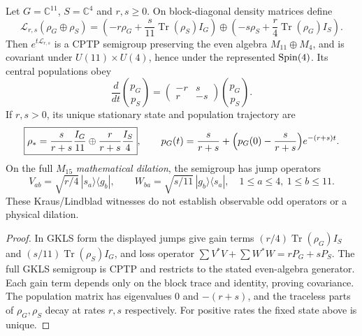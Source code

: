\documentclass[12pt,a4paper]{article}
\begin{document}
\begin{theorem}
\label{p4a:thm:v352-two-rate-transfer}
Let $G=\mathbb C^{11}$, $S=\mathbb C^4$ and $r,s\geq0$.
On block-diagonal density matrices define
\[
 \mathcal L_{r,s}(\rho_G\oplus\rho_S)=
 \left(-r\rho_G+\frac{s}{11}\operatorname{Tr}(\rho_S)I_G\right)
 \oplus
 \left(-s\rho_S+\frac{r}{4}\operatorname{Tr}(\rho_G)I_S\right).
\]
Then $e^{t\mathcal L_{r,s}}$ is a CPTP semigroup preserving the even
algebra $M_{11}\oplus M_4$, and is covariant under
$U(11)\times U(4)$, hence under the represented $\mathrm{Spin}(4)$.
Its central populations obey
\[
 \frac{d}{dt}\binom{p_G}{p_S}
 =\begin{pmatrix}-r&s\\r&-s\end{pmatrix}
   \binom{p_G}{p_S}.
\]
If $r,s>0$, its unique stationary state and population trajectory
are
\[
 \boxed{\rho_*=
 \frac{s}{r+s}\frac{I_G}{11}
 \oplus\frac{r}{r+s}\frac{I_S}{4}},\qquad
 p_G(t)=\frac{s}{r+s}
  +\Bigl(p_G(0)-\frac{s}{r+s}\Bigr)e^{-(r+s)t}.
\]
On the full $M_{15}$ \emph{mathematical dilation}, the semigroup has
jump operators
\[
 V_{ab}=\sqrt{r/4}\,|s_a\rangle\langle g_b|,
 \qquad W_{ba}=\sqrt{s/11}\,|g_b\rangle\langle s_a|,
 \quad 1\leq a\leq4,\ 1\leq b\leq11.
\]
These Kraus/Lindblad witnesses do not establish observable odd
operators or a physical dilation.
\end{theorem}
\begin{proof}
In GKLS form the displayed jumps give gain terms
$(r/4)\operatorname{Tr}(\rho_G)I_S$ and
$(s/11)\operatorname{Tr}(\rho_S)I_G$, and loss operator
$\sum V^*V+\sum W^*W=rP_G+sP_S$.
The full GKLS semigroup is CPTP and restricts to the stated
even-algebra generator.  Each gain term depends only on the
block trace and identity, proving covariance.  The population
matrix has eigenvalues $0$ and $-(r+s)$, and the traceless
parts of $\rho_G,\rho_S$ decay at rates $r,s$ respectively.
For positive rates the fixed state above is unique.
\end{proof}
\end{document}

